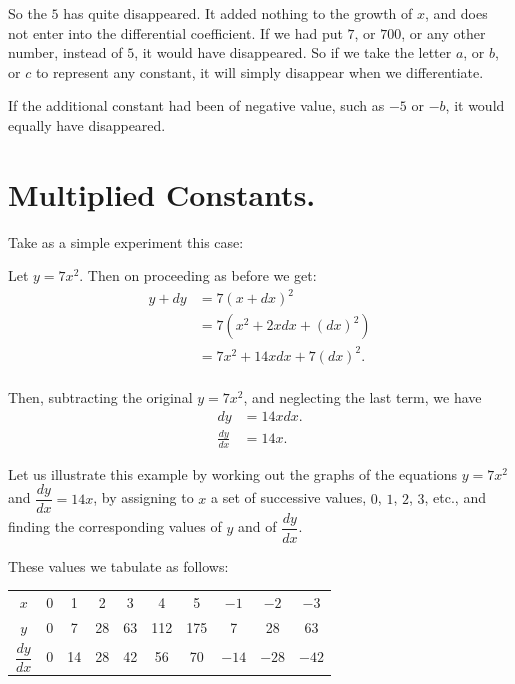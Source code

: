 \documentclass{ximera}
\begin{document}
{{So the $5$ has quite disappeared. It added nothing
to the growth of $x$, and does not enter into the
differential coefficient. If we had put $7$, or $700$, or
any other number, instead of $5$, it would have disappeared.
So if we take the letter $a$, or $b$, or $c$ to
represent any constant, it will simply disappear when
we differentiate.

If the additional constant had been of negative value,
such as $-5$ or $-b$, it would equally have disappeared.


\section{Multiplied Constants.}
Take as a simple experiment this case:

Let $y = 7x^2$.
Then on proceeding as before we get:
\begin{align*}
y + dy &= 7(x+dx)^2 \\
       &= 7(x^2 + 2xdx + (dx)^2) \\
       &= 7x^2 + 14xdx + 7(dx)^2. \\
\end{align*}

Then, subtracting the original $y = 7x^2$, and neglecting
the last term, we have
\begin{align*}
dy &= 14xdx.\\
\frac{dy}{dx} &= 14x.
\end{align*}

Let us illustrate this example by working out the
graphs of the equations $y = 7x^2$ and $\dfrac{dy}{dx} = 14x$, by
assigning to $x$ a set of successive values, $0$, $1$, $2$, $3$, etc.,
and finding the corresponding values of $y$ and of $\dfrac{dy}{dx}$.

These values we tabulate as follows:

\begin{tabular}{cccccccccc}
$x$ & 0 & 1 & 2 & 3 & 4 & 5 & $-1$ & $-2$ & $-3$ \\
$y$ & 0 & 7 & 28 & 63 & 112 & 175 & 7 & 28 & 63 \\
$\dfrac{dy}{dx}$ & 0 & 14 & 28 & 42 & 56 & 70 & $-14$ & $-28$ & $-42$ \\ 
\end{tabular}


\newpage

}}
\end{document}
